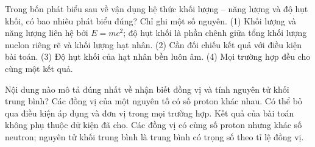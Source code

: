 \begin{ex}
Trong bốn phát biểu sau về vận dụng hệ thức khối lượng – năng lượng và độ hụt khối, có bao nhiêu phát biểu đúng? Chỉ ghi một số nguyên. (1) Khối lượng và năng lượng liên hệ bởi $E=mc^2$; độ hụt khối là phần chênh giữa tổng khối lượng nuclon riêng rẽ và khối lượng hạt nhân. (2) Cần đối chiếu kết quả với điều kiện bài toán. (3) Độ hụt khối của hạt nhân bền luôn âm. (4) Mọi trường hợp đều cho cùng một kết quả.
\end{ex}

\begin{ex}
Nội dung nào mô tả đúng nhất về nhận biết đồng vị và tính nguyên tử khối trung bình?
\choice
{Các đồng vị của một nguyên tố có số proton khác nhau.}
{Có thể bỏ qua điều kiện áp dụng và đơn vị trong mọi trường hợp.}
{Kết quả của bài toán không phụ thuộc dữ kiện đã cho.}
{\True Các đồng vị có cùng số proton nhưng khác số neutron; nguyên tử khối trung bình là trung bình có trọng số theo tỉ lệ đồng vị.}
\end{ex}

